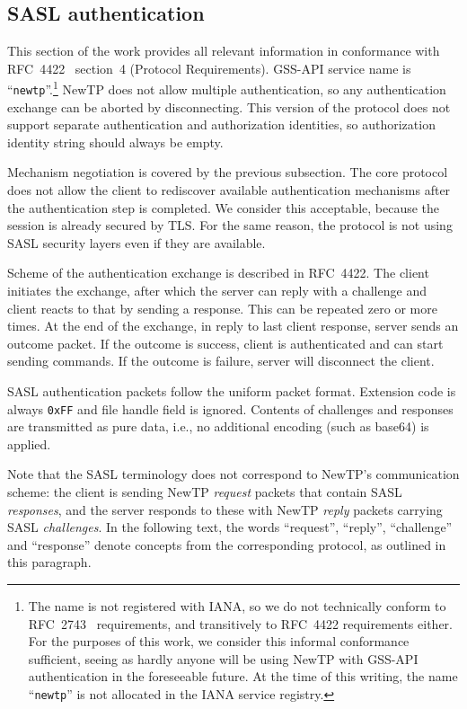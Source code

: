 %

\subsection{SASL authentication}

This section of the work provides all relevant information in conformance with RFC~4422~\cite{rfc4422}
section~4 (Protocol Requirements). GSS-API service name is ``{\tt newtp}''.\footnote{The name is not
registered with IANA, so we do not technically conform to RFC~2743~\cite{rfc2743} requirements, and
transitively to RFC~4422 requirements either. For the purposes of this work, we consider this informal
conformance sufficient, seeing as hardly anyone will be using NewTP with GSS-API authentication in the
foreseeable future. At the time of this writing, the name ``{\tt newtp}'' is not allocated in the IANA service
registry.} NewTP does not allow multiple authentication, so any authentication exchange can be aborted by
disconnecting. This version of the protocol does not support separate authentication and authorization
identities, so authorization identity string should always be empty.

Mechanism negotiation is covered by the previous subsection. The core protocol does not allow the client to
rediscover available authentication mechanisms after the authentication step is completed. We consider this
acceptable, because the session is already secured by TLS. For the same reason, the protocol is not using SASL
security layers even if they are available.

Scheme of the authentication exchange is described in RFC~4422. The client initiates the exchange, after which
the server can reply with a challenge and client reacts to that by sending a response. This can be repeated
zero or more times. At the end of the exchange, in reply to last client response, server sends an outcome
packet.  If the outcome is success, client is authenticated and can start sending commands. If the outcome is
failure, server will disconnect the client.

SASL authentication packets follow the uniform packet format. Extension code is always {\tt 0xFF} and file
handle field is ignored. Contents of challenges and responses are transmitted as pure data, i.e., no
additional encoding (such as base64) is applied.

Note that the SASL terminology does not correspond to NewTP's communication scheme: the client is sending
NewTP {\it request} packets that contain SASL {\it responses}, and the server responds to these with NewTP
{\it reply} packets carrying SASL {\it challenges}. In the following text, the words ``request'', ``reply'',
``challenge'' and ``response'' denote concepts from the corresponding protocol, as outlined in this paragraph.


